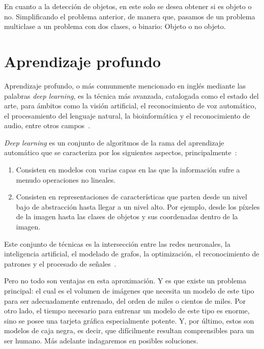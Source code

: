 En cuanto a la detección de objetos, en este solo se desea obtener si es objeto o no. Simplificando el problema anterior, de manera que, pasamos de un problema multiclase a un problema con dos clases, o binario: Objeto o no objeto.



\section{Aprendizaje profundo}

Aprendizaje profundo, o más comunmente mencionado en inglés mediante las palabras \textit{deep learning}, es la técnica más avanzada, catalogada como el estado del arte, para ámbitos como la visión artificial, el reconocimiento de voz automático, el procesamiento del lenguaje natural,  la bioinformática y el reconocimiento de audio, entre otros campos~\cite{ms:deeplearning}.

\textit{Deep learning} es un conjunto de algoritmos de la rama del aprendizaje automático que se caracteriza por los siguientes aspectos, principalmente~\cite{ms:deeplearning}:

\begin{enumerate}
	\item Consisten en modelos con varias capas en las que la información sufre a menudo operaciones no lineales.
	\item Consisten en representaciones de características que parten desde un nivel bajo de abstracción hasta llegar a un nivel alto. Por ejemplo, desde los píxeles de la imagen hasta las clases de objetos y sus coordenadas dentro de la imagen.
\end{enumerate}

Este conjunto de técnicas es la intersección entre las redes neuronales, la inteligencia artificial, el modelado de grafos, la optimización, el reconocimiento de patrones y el procesado de señales~\cite{ms:deeplearning}. %

Pero no todo son ventajas en esta aproximación. Y es que existe un problema principal: el cual es el volumen de imágenes que necesita un modelo de este tipo para ser adecuadamente entrenado, del orden de miles o cientos de miles. Por otro lado, el tiempo necesario para entrenar un modelo de este tipo es enorme, sino se posee una tarjeta gráfica especialmente potente. Y, por último, estos son modelos de caja negra, es decir, que difícilmente resultan comprensibles para un ser humano. Más adelante indagaremos en posibles soluciones.

